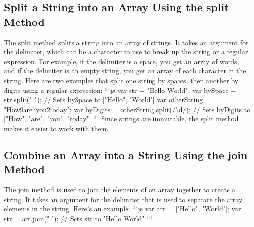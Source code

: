\documentclass{article}%
\begin{document}
%
\subsection{Split a String into an Array Using the split Method}%
\label{subsec:SplitaStringintoanArrayUsingthesplitMethod}%
The split method splits a string into an array of strings. It takes an argument for the delimiter, which can be a character to use to break up the string or a regular expression. For example, if the delimiter is a space, you get an array of words, and if the delimiter is an empty string, you get an array of each character in the string.\newline%
Here are two examples that split one string by spaces, then another by digits using a regular expression:\newline%
```js\newline%
var str = "Hello World";\newline%
var bySpace = str.split(" ");\newline%
// Sets bySpace to {[}"Hello", "World"{]}\newline%
var otherString = "How9are7you2today";\newline%
var byDigits = otherString.split(/\textbackslash{}d/);\newline%
// Sets byDigits to {[}"How", "are", "you", "today"{]}\newline%
```\newline%
Since strings are immutable, the split method makes it easier to work with them.\newline%

%
\subsection{Combine an Array into a String Using the join Method}%
\label{subsec:CombineanArrayintoaStringUsingthejoinMethod}%
The join method is used to join the elements of an array together to create a string. It takes an argument for the delimiter that is used to separate the array elements in the string.\newline%
Here's an example:\newline%
```js\newline%
var arr = {[}"Hello", "World"{]};\newline%
var str = arr.join(" ");\newline%
// Sets str to "Hello World"\newline%
```\newline%
\end{document}

